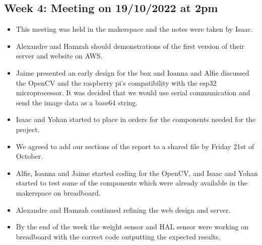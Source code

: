 \subsection{Week 4: Meeting on 19/10/2022 at 2pm }
\begin{itemize}
    \item This meeting was held in the makerspace and the notes were taken by Isaac. 
    \item Alexandre and Hamzah should demonstrations of the first version of their server and website on AWS. 
    \item Jaime presented an early design for the box and Ioanna and Alfie discussed the OpenCV and the raspberry pi's compatibility with the esp32 microprocessor. It was decided that we would use serial communication and send the image data as a base64 string.  
    \item Isaac and Yohan started to place in orders for the components needed for the project.  
    \item We agreed to add our sections of the report to a shared file by Friday 21st of October. 
    \item Alfie, Ioanna and Jaime started coding for the OpenCV, and Isaac and Yohan started to test some of the components which were already available in the makerspace on breadboard. 
    \item Alexandre and Hamzah continued refining the web design and server. 
    \item By the end of the week the weight sensor and HAL sensor were working on breadboard with the correct code outputting the expected results. 
\end{itemize}
   







